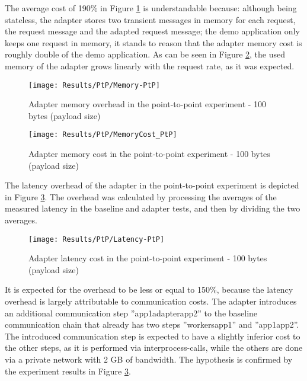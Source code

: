 The average cost of 190\% in Figure \ref{fig:memPtp} is understandable because: although being stateless, the adapter stores two transient messages in memory for each request, the request message and the adapted request message;
the demo application only keeps one request in memory, it stands to reason that the adapter memory cost is roughly double of the demo application.
As can be seen in Figure \ref{fig:memCostPtp}, the used memory of the adapter grows linearly with the request rate, as it was expected.

\begin{figure}[htbp]
    \centering
    \centerline{\texttt{[image: Results/PtP/Memory-PtP]}}
    \caption{Adapter memory overhead in the point-to-point experiment - 100 bytes (payload size)}
    \label{fig:memPtp}
\end{figure}

\begin{figure}[htbp]
    \centering
    \centerline{\texttt{[image: Results/PtP/MemoryCost\_PtP]}}
    \caption{Adapter memory cost in the point-to-point experiment - 100 bytes (payload size)}
    \label{fig:memCostPtp}
\end{figure}

\newpage

The latency overhead of the adapter in the point-to-point experiment is depicted in Figure \ref{fig:latPtP}.
The overhead was calculated by processing the averages of the measured latency in the baseline and adapter tests, and then by dividing the two averages.

\begin{figure}[htbp]
    \centering
    \centerline{\texttt{[image: Results/PtP/Latency-PtP]}}
    \caption{Adapter latency cost in the point-to-point experiment - 100 bytes (payload size)}
    \label{fig:latPtP}
\end{figure}

It is expected for the overhead to be less or equal to 150\%, because the latency overhead is largely attributable to communication costs.
The adapter introduces an additional communication step ''app1\textrightarrow adapter\textrightarrow app2'' to the baseline communication chain that already has two steps ''workers\textrightarrow app1'' and ''app1\textrightarrow app2''.
The introduced communication step is expected to have a slightly inferior cost to the other steps, as it is performed via interprocess-calls, while the others are done via a private network with 2 GB of bandwidth.
The hypothesis is confirmed by the experiment results in Figure \ref{fig:latPtP}.

